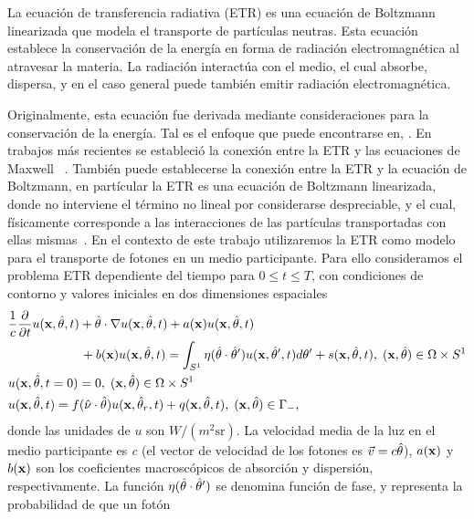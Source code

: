 La ecuación de transferencia radiativa (ETR) es una ecuación de Boltzmann 
linearizada que modela el transporte de partículas neutras. Esta ecuación establece 
la conservación de la energía en forma de  
radiación electromagnética al atravesar la materia. La radiación 
interactúa con el medio, el cual absorbe, dispersa, y en el caso 
general puede también emitir radiación electromagnética. 

Originalmente, esta ecuación fue derivada mediante 
consideraciones para la conservación de la energía. Tal es el enfoque 
que puede encontrarse en, \eg\cite{Chandrasekhar1960,Lewis1984}. En trabajos 
más recientes se estableció la conexión entre la ETR y las ecuaciones de Maxwell
~\cite{Mishchenko1999, Prasher2003}. También puede establecerse 
la conexión entre la ETR y la ecuación de Boltzmann, 
en partícular la ETR es una ecuación de Boltzmann linearizada, 
donde no interviene el término no lineal por considerarse 
despreciable, y el cual, físicamente corresponde a las 
interacciones de las partículas transportadas con ellas mismas~\cite[Cap. 4]{Cercignani1988}. 
En el contexto de este trabajo utilizaremos la ETR como modelo para el transporte 
de fotones en un medio participante. Para ello consideramos el problema ETR dependiente 
del tiempo para $0\leq t\leq T$, con condiciones de contorno y valores iniciales 
en dos dimensiones espaciales 
\begin{equation}
\begin{split}
\begin{aligned}
&\frac{1}{c}\frac{\partial }{\partial t}u(\mathbf{x},\hat{\theta},t) + \hat{\theta} \cdot \nabla u(\mathbf{x},\hat{\theta},t)+a(\mathbf{x})u(\mathbf{x},\hat{\theta},t)  \\
&\quad \quad \quad  \quad \quad \; \;\,  +b(\mathbf{x})u(\mathbf{x},\hat{\theta},t) = \int_{S^1}\eta(\hat{\theta}\cdot\hat{\theta} ') 
u(\mathbf{x},\hat \theta',t) d\theta'+ s(\mathbf{x},\hat{\theta},t),\;  (\mathbf{x},\hat{\theta})  \in \Omega\times S^1\\
&u(\mathbf{x},\hat{\theta},t=0)=0, \;  (\mathbf{x},\hat{\theta})  \in \Omega\times S^1\\
&u(\mathbf{x},\hat{\theta},t)=f(\hat{\nu} \cdot \hat{\theta}) u(\mathbf{x},\hat{\theta}_r,t) + q(\mathbf{x},\hat{\theta},t) , \; (\mathbf{x},\hat{\theta}) \in \Gamma_-,
\end{aligned}
\end{split}
\label{eq:RTE}
\end{equation}
donde las unidades de $u$ son $ W / (m ^ 2  \mathrm{sr}) $.
La velocidad media de la luz en el medio participante es \textit{c} 
(el vector de velocidad de los fotones es $ \vec {v} = c \hat{\theta} $), $a(\mathbf{x})$ y $b(\mathbf{x})$ son los 
coeficientes macroscópicos de absorción y dispersión, respectivamente. La función $\eta(\hat{\theta}\cdot\hat{\theta} ')$
se denomina función de fase, y representa la probabilidad de que un fotón 
